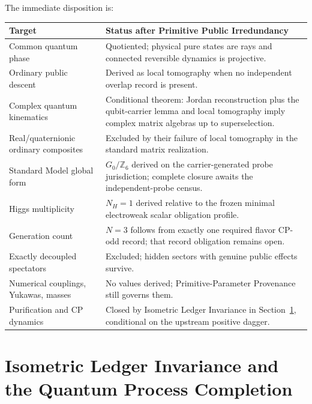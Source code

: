 \begin{remark}
The immediate disposition is:
\begin{center}
\small
\begin{tabularx}{\textwidth}{l Y}
\toprule
Target & Status after Primitive Public Irredundancy \\
\midrule
Common quantum phase
& Quotiented; physical pure states are rays and connected reversible dynamics is projective. \\
Ordinary public descent
& Derived as local tomography when no independent overlap record is present. \\
Complex quantum kinematics
& Conditional theorem: Jordan reconstruction plus the qubit-carrier lemma and local tomography imply complex matrix algebras up to superselection. \\
Real/quaternionic ordinary composites
& Excluded by their failure of local tomography in the standard matrix realization. \\
Standard Model global form
& \(G_0/\mathbb Z_6\) derived on the carrier-generated probe jurisdiction; complete closure awaits the independent-probe census. \\
Higgs multiplicity
& \(N_H=1\) derived relative to the frozen minimal electroweak scalar obligation profile. \\
Generation count
& \(N=3\) follows from exactly one required flavor CP-odd record; that record obligation remains open. \\
Exactly decoupled spectators
& Excluded; hidden sectors with genuine public effects survive. \\
Numerical couplings, Yukawas, masses
& No values derived; Primitive-Parameter Provenance still governs them. \\
Purification and CP dynamics
& Closed by Isometric Ledger Invariance in Section~\ref{sec:isometric-ledger-invariance}, conditional on the upstream positive dagger. \\
\bottomrule
\end{tabularx}
\end{center}
\end{remark}



\section{Isometric Ledger Invariance and the Quantum Process Completion}
\label{sec:isometric-ledger-invariance}


